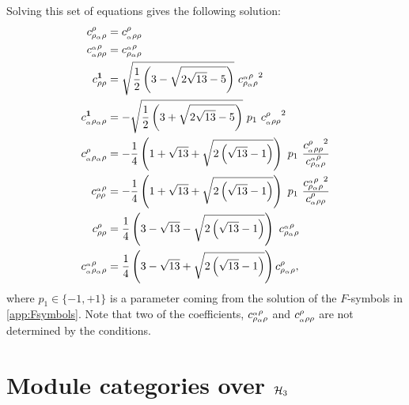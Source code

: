 {{{\begin{equation}
	\end{equation}
Solving this set of equations gives the following solution:
	\begin{align}
		c_{\rho {}_\alpha\rho}^{\rho}&=c_{{{}_\alpha\rho}\rho}^\rho\\
		c_{{}_\alpha\rho \rho}^{{}_\alpha\rho}&=c_{\rho{{}_\alpha\rho}}^{{}_\alpha\rho}\\
		c_{\rho\rho}^\mathbf{1}&=\sqrt{\frac{1}{2} \left(3-\sqrt{2 \sqrt{13}-5}\right)}\ {c_{\rho{}_\alpha\rho}^{{}_\alpha\rho}}^2\\
		c_{{}_\alpha\rho {}_\alpha\rho}^\mathbf{1}&=-\sqrt{\frac{1}{2} \left(3+\sqrt{2 \sqrt{13}-5}\right)}\ p_1\  {c_{{{}_\alpha\rho}\rho}^\rho}^2\\
		c_{{}_\alpha\rho {}_\alpha\rho}^\rho&=-\frac{1}{4}\left(1+\sqrt{13}+\sqrt{2 \left(\sqrt{13}-1\right)}\right)\ p_1\ \frac{{c_{{{}_\alpha\rho} \rho}^{\rho}}^2}{c_{\rho{{}_\alpha\rho}}^{{}_\alpha\rho}}\\
		c_{\rho \rho}^{{}_\alpha\rho}&=-\frac{1}{4}\left(1+\sqrt{13}+\sqrt{2 \left(\sqrt{13}-1\right)}\right)\ p_1\ \frac{{c_{\rho {{}_\alpha\rho}}^{{{}_\alpha\rho}}}^2}{c_{{{}_\alpha\rho}\rho}^\rho}\\
		c_{\rho \rho}^\rho&=\frac{1}{4} \left(3-\sqrt{13}-\sqrt{2 \left(\sqrt{13}-1\right)}\right)\ c_{\rho {}_\alpha\rho}^{{}_\alpha\rho}\\
		c_{{}_\alpha\rho {}_\alpha\rho}^{{}_\alpha\rho}&=\frac{1}{4} \left(3-\sqrt{13}+\sqrt{2 \left(\sqrt{13}-1\right)}\right)c_{\rho {}_\alpha\rho}^\rho,
	\end{align}
where $p_1\in\{-1,+1\}$ is a parameter coming from the solution of the $F$-symbols in \cref{app:Fsymbols}. Note that two of the coefficients, $c_{\rho{{}_\alpha\rho}}^{{}_\alpha\rho}$ and $c_{{{}_\alpha\rho}\rho}^\rho$ are not determined by the conditions.


\section{Module categories over ${\mathcal{H}_3}$}

}}}
